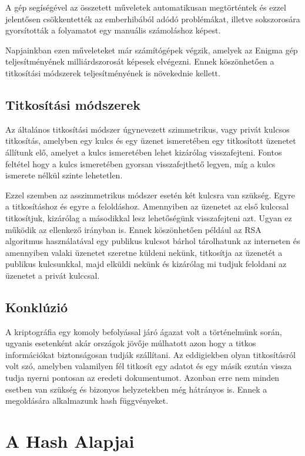 A gép segíségével az összetett műveletek automatikusan megtörténtek és ezzel jelentősen csökkentették az emberhibából adódó problémákat, illetve sokszorosára gyorsították a folyamatot egy manuális számoláshoz képest.

Napjainkban ezen műveleteket már számítógépek végzik, amelyek az Enigma gép teljesítményének milliárdszorosát képesek elvégezni. Ennek köszönhetően a titkosítási módszerek teljesítményének is növekednie kellett.

\subsection{Titkosítási módszerek}

Az általános titkosítási módszer úgynevezett szimmetrikus, vagy privát kulcsos titkosítás, amelyben egy kulcs és egy üzenet ismeretében egy titkosított üzenetet állítunk elő, amelyet a kulcs ismeretében lehet kizárólag visszafejteni. Fontos feltétel hogy a kulcs ismeretében gyorsan visszafejthető legyen, míg a kulcs ismerete nélkül szinte lehetetlen.

Ezzel szemben az asszimmetrikus módszer esetén két kulcsra van szükség. Egyre a titkosításhoz és egyre a feloldáshoz. Amennyiben az üzenetet az első kulccsal titkosítjuk, kizárólag a másodikkal lesz lehetőségünk visszafejteni azt. Ugyan ez működik az ellenkező irányban is. Ennek köszönhetően például az RSA algoritmus használatával egy publikus kulcsot bárhol tárolhatunk az interneten és amennyiben valaki üzenetet szeretne küldeni nekünk, titkosítja az üzenetét a publikus kulcsunkkal, majd elküldi nekünk és kizárólag mi tudjuk feloldani az üzenetet a privát kulccsal.

\subsection{Konklúzió}

A kriptográfia egy komoly befolyással járó ágazat volt a történelmünk során, ugyanis esetenként akár országok jövője múlhatott azon hogy a titkos információkat biztonságosan tudják szállítani.
Az eddigiekben olyan titkosításról volt szó, amelyben valamilyen fél titkosít egy adatot és egy másik ezután vissza tudja nyerni pontosan az eredeti dokumentumot. Azonban erre nem minden esetben van szükség és bizonyos helyzetekben még hátrányos is. Ennek a megoldására alkalmazunk hash függvényeket.

\section{A Hash Alapjai}



